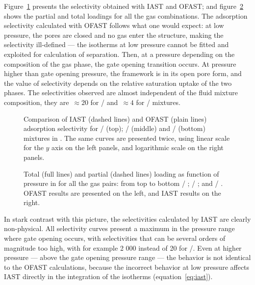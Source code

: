 \documentclass[thesis]{subfiles}
\begin{document}
Figure~\ref{fig:cu-dhbc:iast-ofast:selectivity} presents the selectivity
obtained with IAST and OFAST; and figure~\ref{fig:cu-dhbc:iast-ofast:loadings}
shows the partial and total loadings for all the gas combinations. The
adsorption selectivity calculated with OFAST follows what one would expect: at
low pressure, the pores are closed and no gas enter the structure, making the
selectivity ill-defined --- the isotherms at low pressure cannot be fitted and
exploited for calculation of separation.  Then, at a pressure depending on the
composition of the gas phase, the gate opening transition occurs. At pressure
higher than gate opening pressure, the framework is in its open pore form, and
the value of selectivity depends on the relative saturation uptake of the two
phases. The selectivities observed are almost independent of the fluid mixture
composition, they are~$\approx 20$ for / and~$\approx 4$ for
/ mixtures.

\begin{figure}[htp]
    \centering
    
    \caption{Comparison of IAST (dashed lines) and OFAST (plain lines)
    adsorption selectivity for / (top); / (middle)
    and / (bottom) mixtures in \Cudhbc. The same curves are
    presented twice, using linear scale for the $y$ axis on the left panels, and
    logarithmic scale on the right panels.}
    \label{fig:cu-dhbc:iast-ofast:selectivity}
\end{figure}

\begin{figure}[htp]
    \centering
    
    \caption{Total (full lines) and partial (dashed lines) loading as function
    of pressure in \Cudhbc for all the gas pairs: from top to bottom  /
    ;  / ; and  / . OFAST results are
    presented on the left, and IAST results on the right.}
    \label{fig:cu-dhbc:iast-ofast:loadings}
\end{figure}

In stark contrast with this picture, the selectivities calculated by IAST are
clearly non-physical. All selectivity curves present a maximum in the pressure
range where gate opening occurs, with selectivities that can be several orders
of magnitude too high, with for example 2 000 instead of 20 for
/. Even at higher pressure --- above the gate opening pressure
range --- the behavior is not identical to the OFAST calculations, because the
incorrect behavior at low pressure affects IAST directly in the integration of
the isotherms (equation~\eqref{eq:iast}).
\end{document}
